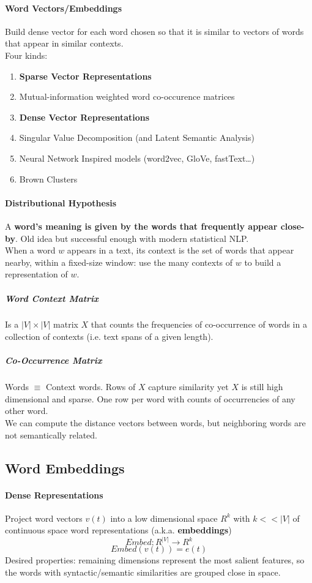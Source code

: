 \documentclass[10pt]{report}
\begin{document}
\paragraph{Word Vectors/Embeddings} Build dense vector for each word chosen so that it is similar to vectors of words that appear in similar contexts.\\
Four kinds:\begin{enumerate}
	\item[] \textbf{Sparse Vector Representations}
	\item Mutual-information weighted word co-occurence matrices
	\item[] \textbf{Dense Vector Representations}
	\item Singular Value Decomposition (and Latent Semantic Analysis)
	\item Neural Network Inspired models (word2vec, GloVe, fastText\ldots)
	\item Brown Clusters
\end{enumerate}
\paragraph{Distributional Hypothesis} A \textbf{word's meaning is given by the words that frequently appear close-by}. Old idea but successful enough with modern statistical NLP.\\
When a word $w$ appears in a text, its context is the set of words that appear nearby, within a fixed-size window: use the many contexts of $w$ to build a representation of $w$.
\subparagraph{Word Context Matrix} Is a $|V|\times|V|$ matrix $X$ that counts the frequencies of co-occurrence of words in a collection of contexts (i.e. text spans of a given length).
\subparagraph{Co-Occurrence Matrix} Words $\equiv$ Context words. Rows of $X$ capture similarity yet $X$ is still high dimensional and sparse. One row per word with counts of occurrencies of any other word.\\
We can compute the distance vectors between words, but neighboring words are not semantically related.
\subsection{Word Embeddings}
\paragraph{Dense Representations} Project word vectors $v(t)$ into a low dimensional space $R^k$ with $k<<|V|$ of continuous space word representations (a.k.a. \textbf{embeddings})
$$Embed : R^{|V|}\rightarrow R^k$$
$$Embed(v(t)) = e(t)$$
Desired properties: remaining dimensions represent the most salient features, so the words with syntactic/semantic similarities are grouped close in space.
\end{document}
